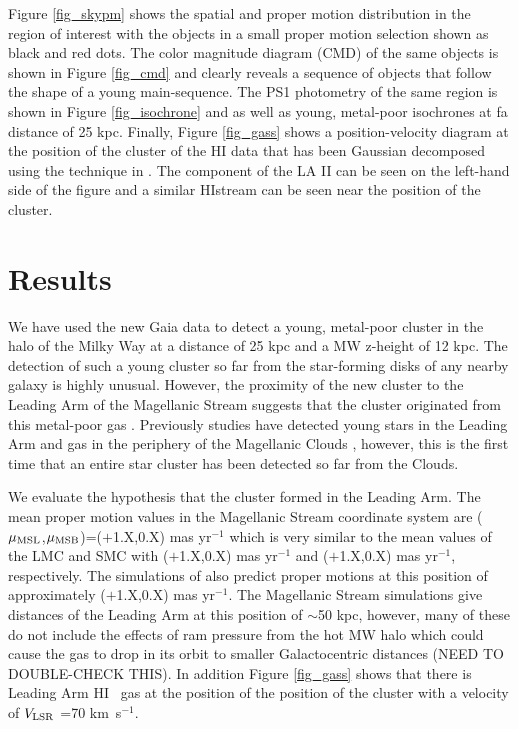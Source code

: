 \documentclass[modern]{aastex62}
\newcommand{\kmse}{\mbox{km s$^{-1}$}}
\newcommand{\vlsr}{$V_{\rm LSR}~$}
\newcommand{\hi}{H{\footnotesize I} }
\newcommand{\hie}{H{\footnotesize I}}
\begin{document}
Figure \ref{fig_skypm} shows the spatial and proper motion distribution in the region of interest with the objects in
a small proper motion selection shown as black and red dots.  The color magnitude diagram (CMD) of the same objects
is shown in Figure \ref{fig_cmd} and clearly reveals a sequence of objects that follow the shape of a young main-sequence.
The PS1 photometry of the same region is shown in Figure \ref{fig_isochrone} and as well as young, metal-poor isochrones at fa distance of 25 kpc.  Finally, Figure \ref{fig_gass} shows a position-velocity diagram at the position of the cluster of the \citep[GASS;][]{McClure-Griffiths2009} \hi data that has been Gaussian decomposed using the technique in \citet{Nidever2008}.
The component of the LA II can be seen on the left-hand side of the figure and a similar \hie stream can be seen near the
position of the cluster.


\section{Results} \label{sec:results}

We have used the new Gaia data to detect a young, metal-poor cluster in the halo of the Milky Way at a distance of 25 kpc and a MW z-height of 12 kpc.  The detection of such a young cluster so far from the star-forming disks of any nearby
galaxy is highly unusual.  However, the proximity of the new cluster to the Leading Arm of the Magellanic Stream suggests
that the cluster originated from this metal-poor gas \citep{Fox2018}.  Previously studies have detected young stars in the Leading Arm and gas in the periphery of the Magellanic Clouds \citep{Casetti-Dinescu2014,MoniBidin2017}, however, this is the first time that an entire star cluster has been detected so far from the Clouds.

We evaluate the hypothesis that the cluster formed in the Leading Arm.  The mean proper motion values in the Magellanic Stream coordinate system \citep{Nidever2008} are ($\mu_{\rm MSL}$,$\mu_{\rm MSB}$)=($+$1.X,0.X) mas yr$^{-1}$ which is very similar to the mean values of the LMC and SMC with ($+$1.X,0.X) mas yr$^{-1}$ and ($+$1.X,0.X) mas yr$^{-1}$, respectively.  The simulations of \citet{Besla:2012} also predict proper motions at this position of approximately ($+$1.X,0.X) mas yr$^{-1}$.  The Magellanic Stream simulations give distances of the Leading Arm at this position of $\sim$50 kpc, however, many of these do not include the effects of ram pressure from the hot MW halo which could cause the gas to drop in its orbit to smaller Galactocentric distances (NEED TO DOUBLE-CHECK THIS).  In addition Figure \ref{fig_gass} shows that there is Leading Arm \hi~gas at the position of the position of the cluster with a velocity of \vlsr=70 \kmse.
\end{document}
